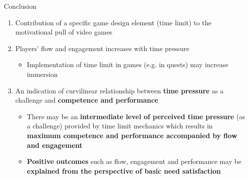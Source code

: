 \documentclass{beamer}
\begin{document}
\begin{frame}{Conclusion}
\begin{adjustwidth}{-1.5em}{-1.5em}
  \begin{enumerate}
  \item \alert{Contribution of a specific game design element} (time limit) to the motivational pull of video games
  \item Players’ \alert{flow and engagement increases with time pressure}
  	\begin{itemize}
  		\item Implementation of time limit in games (e.g. in quests) may increase immersion
  	\end{itemize}
  \item An \alert{indication of curvilinear relationship} between \textbf{time pressure} as a challenge and \textbf{competence and performance}
  \begin{itemize}
  	\item There may be an \textbf{intermediate level of perceived time pressure} (as a challenge) provided by time limit mechanics which results in \textbf{maximum competence and performance accompanied by flow and engagement}
  	\item \textbf{Positive outcomes} such as flow, engagement and performance may be \textbf{explained from the perspective of basic need satisfaction}
  	\end{itemize}
  \end{enumerate}
  \end{adjustwidth}
\end{frame}
\end{document}
